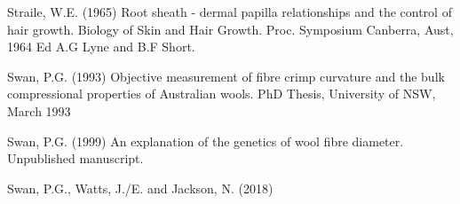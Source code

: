 \documentclass[titlepage]{article}  %
\begin{document}
\begin{thebibliography}{99}
Straile, W.E. (1965) Root sheath - dermal papilla relationships and the control of hair growth. Biology of Skin and Hair Growth.  Proc. Symposium Canberra, Aust, 1964 Ed A.G Lyne and B.F Short.

Swan, P.G. (1993) Objective measurement of fibre crimp curvature and the bulk compressional properties of Australian wools. PhD Thesis, University of NSW, March 1993 

Swan, P.G. (1999) An explanation of the genetics of wool fibre diameter. Unpublished manuscript.

Swan, P.G., Watts, J./E. and Jackson, N. (2018)
\end{thebibliography}
\end{document}
